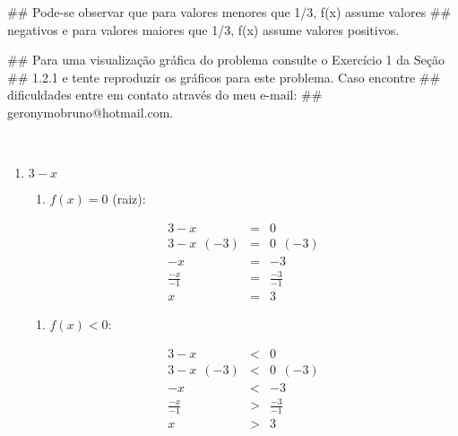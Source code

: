 \documentclass[]{book}
\newenvironment{Shaded}{\begin{snugshade}}{\end{snugshade}}
\newcommand{\NormalTok}[1]{#1}
\providecommand{\tightlist}{%
  \setlength{\itemsep}{0pt}\setlength{\parskip}{0pt}}
\begin{document}
\begin{enumerate}
\begin{Shaded}
\begin{Highlighting}[]
\NormalTok{##  Pode-se observar que para valores menores que 1/3, f(x) assume valores}
\NormalTok{## negativos e para valores maiores que 1/3, f(x) assume valores positivos.}

\NormalTok{##  Para uma visualização gráfica do problema consulte o Exercício 1 da Seção}
\NormalTok{## 1.2.1 e tente reproduzir os gráficos para este problema. Caso encontre}
\NormalTok{## dificuldades entre em contato através do meu e-mail:}
\NormalTok{## geronymobruno@hotmail.com.}
\end{Highlighting}
\end{Shaded}

  ~

  \begin{enumerate}
  \def\labelenumii{\alph{enumii})}
  \setcounter{enumii}{1}
  \item
    \(3-x\)

    \begin{enumerate}
    \def\labelenumiii{\roman{enumiii})}
    \tightlist
    \item
      \(f(x) = 0\) (raiz):
    \end{enumerate}

    \begin{eqnarray}
    3-x &=& 0 \nonumber \\
    3-x \ \ (-3) &=& 0 \ \ (-3) \nonumber \\
    -x &=& -3 \nonumber \\
    \frac{-x}{-1} &=& \frac{-3}{-1} \nonumber \\
    x &=& 3 \nonumber
    \end{eqnarray}

    \begin{enumerate}
    \def\labelenumiii{\roman{enumiii})}
    \setcounter{enumiii}{1}
    \tightlist
    \item
      \(f(x) < 0\):
    \end{enumerate}

    \begin{eqnarray}
    3-x &<& 0 \nonumber \\
    3-x \ \ (-3) &<& 0 \ \ (-3) \nonumber \\
    -x &<& -3 \nonumber \\
    \frac{-x}{-1} &>& \frac{-3}{-1} \nonumber \\
    x &>& 3 \nonumber
    \end{eqnarray}


\end{enumerate}
\end{enumerate}
\end{document}
